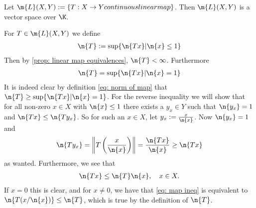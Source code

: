 Let $\m{L}(X,Y):=\{ T : X \to Y continuous linear map \}$. Then $\m{L}(X,Y)$ is a vector space over $\K$.
\begin{remark}
For $T\in \m{L}(X, Y)$ we define
\begin{align}
	\n{T}:=\sup \{ \n{Tx} | \n{x} \le 1 \} \label{eq: norm of map}
\end{align}
Then by \cref{prop: linear map equivalences}, $\n{T}<\infty$. Furthermore
\begin{align*}
	\n{T} = \sup \{ \n{Tx} | \n{x} = 1 \}
\end{align*}
It is indeed clear by definition \eqref{eq: norm of map} that $\n{T}\ge \sup \{ \n{Tx} | \n{x} = 1 \}$. For the reverse inequality we will show that for all non-zero $x\in X$ with $\n{x}\le1$ there exists a $y_{x}\in Y$ such that $\n{y_{x}}=1$ and $\n{Tx}\le \n{Ty_{x}}$. So for such an $x\in X$, let $y_{x}:=\frac{x}{\n{x}}$. Now $\n{y_{x}}=1$ and 
\begin{align*}
	\n{Ty_{x}} = \left\Vert T\left(\frac{x}{\n{x}}\right) \right\Vert=\frac{\n{Tx}}{\n{x}}\ge \n{Tx}
\end{align*}
as wanted. Furthermore, we see that
\begin{align}
	\n{Tx} \le \n{T}\n{x}, \quad x\in X. \label{eq: map ineq}
\end{align}
If $x=0$ this is clear, and for $x\neq 0$, we have that \eqref{eq: map ineq} is equivalent to $\n{T(x/\n{x})}\le \n{T}$, which is true by the definition of $\n{T}$.
\end{remark}

